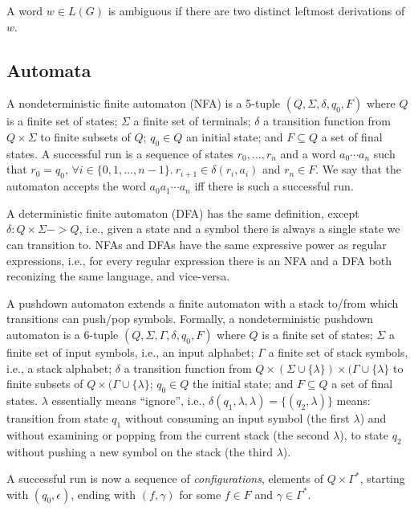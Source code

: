 \documentclass[runningheads]{llncs}
\newcommand{\T}{\Sigma} %
\begin{document}
\begin{definition}
A word $w \in L(G)$ is ambiguous if there are two distinct leftmost derivations of $w$.
\end{definition}

\subsection{Automata} \label{sec:preliminaries-automata}

A nondeterministic finite automaton (NFA) is a 5-tuple $(Q, \T, \delta, q_0, F)$ where $Q$ is a finite set of states; $\T$ a finite set of terminals; $\delta$ a transition function from $Q \times \T$ to finite subsets of $Q$; $q_0 \in Q$ an initial state; and $F \subseteq Q$ a set of final states. A successful run is a sequence of states $r_0, \ldots, r_n$ and a word $a_0\cdots a_n$ such that $r_0 = q_0$, $\forall i \in \{0, 1, \ldots, n-1\}.\ r_{i+1} \in \delta(r_i, a_i)$ and $r_n \in F$. We say that the automaton accepts the word $a_0a_1\cdots a_n$ iff there is such a successful run.

A deterministic finite automaton (DFA) has the same definition, except $\delta : Q \times \Sigma -> Q$, i.e., given a state and a symbol there is always a single state we can transition to. NFAs and DFAs have the same expressive power as regular expressions, i.e., for every regular expression there is an NFA and a DFA both reconizing the same language, and vice-versa. %

A pushdown automaton extends a finite automaton with a stack to/from which transitions can push/pop symbols. Formally, a nondeterministic pushdown automaton is a 6-tuple $(Q, \T, \Gamma, \delta, q_0, F)$ where $Q$ is a finite set of states; $\T$ a finite set of input symbols, i.e., an input alphabet; $\Gamma$ a finite set of stack symbols, i.e., a stack alphabet; $\delta$ a transition function from $Q \times (\T \cup \{\lambda\}) \times (\Gamma \cup \{\lambda\}$ to finite subsets of $Q \times (\Gamma \cup \{\lambda\}$; $q_0 \in Q$ the initial state; and $F \subseteq Q$ a set of final states. $\lambda$ essentially means ``ignore'', i.e., $\delta(q_1, \lambda, \lambda) = \{(q_2, \lambda)\}$ means: transition from state $q_1$ without consuming an input symbol (the first $\lambda$) and without examining or popping from the current stack (the second $\lambda$), to state $q_2$ without pushing a new symbol on the stack (the third $\lambda$).

A successful run is now a sequence of \emph{configurations}, elements of $Q \times \Gamma^{*}$, starting with $(q_0, \epsilon)$, ending with $(f, \gamma)$ for some $f \in F$ and $\gamma \in \Gamma^{*}$.
\end{document}

